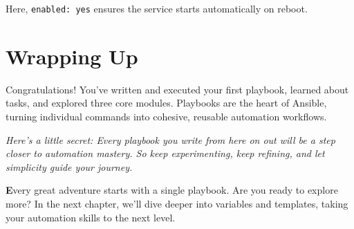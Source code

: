 Here, \texttt{enabled: yes} ensures the service starts automatically on reboot.

\section{Wrapping Up}

Congratulations! You've written and executed your first playbook, learned about tasks, and explored three core modules. Playbooks are the heart of Ansible, turning individual commands into cohesive, reusable automation workflows.

\vspace{1em}

\textit{Here's a little secret: Every playbook you write from here on out will be a step closer to automation mastery. So keep experimenting, keep refining, and let simplicity guide your journey.}

\vspace{1em}

\textbf{E}very great adventure starts with a single playbook. Are you ready to explore more? In the next chapter, we'll dive deeper into variables and templates, taking your automation skills to the next level.
